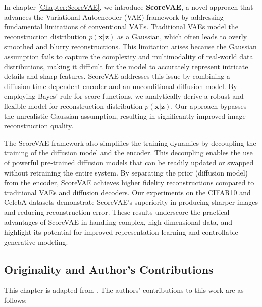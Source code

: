 In chapter \ref{Chapter:ScoreVAE}, we introduce \textbf{ScoreVAE}, a novel approach that advances the Variational Autoencoder (VAE) framework by addressing fundamental limitations of conventional VAEs. Traditional VAEs model the reconstruction distribution $p(\mathbf{x}|\mathbf{z})$ as a Gaussian, which often leads to overly smoothed and blurry reconstructions. This limitation arises because the Gaussian assumption fails to capture the complexity and multimodality of real-world data distributions, making it difficult for the model to accurately represent intricate details and sharp features. ScoreVAE addresses this issue by combining a diffusion-time-dependent encoder and an unconditional diffusion model. By employing Bayes' rule for score functions, we analytically derive a robust and flexible model for reconstruction distribution $p(\mathbf{x}|\mathbf{z})$. Our approach bypasses the unrealistic Gaussian assumption, resulting in significantly improved image reconstruction quality.

The ScoreVAE framework also simplifies the training dynamics by decoupling the training of the diffusion model and the encoder. This decoupling enables the use of powerful pre-trained diffusion models that can be readily updated or swapped without retraining the entire system. By separating the prior (diffusion model) from the encoder, ScoreVAE achieves higher fidelity reconstructions compared to traditional VAEs and diffusion decoders. Our experiments on the CIFAR10 and CelebA datasets demonstrate ScoreVAE’s superiority in producing sharper images and reducing reconstruction error. These results underscore the practical advantages of ScoreVAE in handling complex, high-dimensional data, and highlight its potential for improved representation learning and controllable generative modeling.

\subsection*{Originality and Author’s Contributions}

This chapter is adapted from \cite{batzolis2023variational}. The authors' contributions to this work are as follows:

